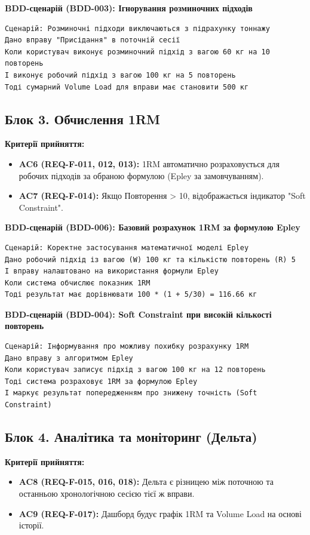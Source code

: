 \documentclass[12pt]{article}
\begin{document}
\textbf{BDD-сценарій (BDD-003): Ігнорування розминочних підходів}
\begin{verbatim}
Сценарій: Розминочні підходи виключаються з підрахунку тоннажу
Дано вправу "Присідання" в поточній сесії
Коли користувач виконує розминочний підхід з вагою 60 кг на 10 повторень
І виконує робочий підхід з вагою 100 кг на 5 повторень
Тоді сумарний Volume Load для вправи має становити 500 кг
\end{verbatim}

\subsection{Блок 3. Обчислення 1RM}
\textbf{Критерії прийняття:}
\begin{itemize}
    \item \textbf{AC6 (REQ-F-011, 012, 013):} 1RM автоматично розраховується для робочих підходів за обраною формулою (Epley за замовчуванням).
    \item \textbf{AC7 (REQ-F-014):} Якщо Повторення > 10, відображається індикатор "Soft Constraint".
\end{itemize}

\textbf{BDD-сценарій (BDD-006): Базовий розрахунок 1RM за формулою Epley}
\begin{verbatim}
Сценарій: Коректне застосування математичної моделі Epley
Дано робочий підхід із вагою (W) 100 кг та кількістю повторень (R) 5
І вправу налаштовано на використання формули Epley
Коли система обчислює показник 1RM
Тоді результат має дорівнювати 100 * (1 + 5/30) = 116.66 кг
\end{verbatim}

\textbf{BDD-сценарій (BDD-004): Soft Constraint при високій кількості повторень}
\begin{verbatim}
Сценарій: Інформування про можливу похибку розрахунку 1RM
Дано вправу з алгоритмом Epley
Коли користувач записує підхід з вагою 100 кг на 12 повторень
Тоді система розраховує 1RM за формулою Epley
І маркує результат попередженням про знижену точність (Soft Constraint)
\end{verbatim}

\subsection{Блок 4. Аналітика та моніторинг (Дельта)}
\textbf{Критерії прийняття:}
\begin{itemize}
    \item \textbf{AC8 (REQ-F-015, 016, 018):} Дельта є різницею між поточною та останньою хронологічною сесією тієї ж вправи.
    \item \textbf{AC9 (REQ-F-017):} Дашборд будує графік 1RM та Volume Load на основі історії.
\end{itemize}
\end{document}
